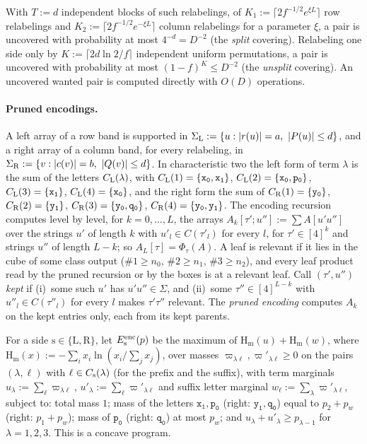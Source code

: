 \documentclass[11pt]{article}
\theoremstyle{definition}
\theoremstyle{remark}
\newcommand{\tl}[1]{\mathtt{#1}}
\newcommand{\Hm}{\mathrm{H}_{\mathrm m}}
\begin{document}
With $T:=d$ independent blocks of such relabelings, of $K_1:=\lceil2f^{-1/2}e^{\xi L}\rceil$ row relabelings and $K_2:=\lceil2f^{-1/2}e^{-\xi L}\rceil$ column relabelings for a parameter $\xi$, a pair is uncovered with probability at most $4^{-d}=D^{-2}$ (the \emph{split} covering). Relabeling one side only by $K:=\lceil2d\ln2/f\rceil$ independent uniform permutations, a pair is uncovered with probability at most $(1-f)^K\le D^{-2}$ (the \emph{unsplit} covering). An uncovered wanted pair is computed directly with $O(D)$ operations.

\paragraph{Pruned encodings.} A left array of a row band is supported in $\Sigma_{\rm L}:=\{u:|r(u)|=a,\ |P(u)|\le d\}$, and a right array of a column band, for every relabeling, in $\Sigma_{\rm R}:=\{v:|c(v)|=b,\ |Q(v)|\le d\}$. In characteristic two the left form of term $\lambda$ is the sum of the letters $C_{\rm L}(\lambda)$, with $C_{\rm L}(1)=\{\tl{x_0},\tl{x_1}\}$, $C_{\rm L}(2)=\{\tl{x_0},\tl{p_0}\}$, $C_{\rm L}(3)=\{\tl{x_1}\}$, $C_{\rm L}(4)=\{\tl{x_0}\}$, and the right form the sum of $C_{\rm R}(1)=\{\tl{y_0}\}$, $C_{\rm R}(2)=\{\tl{y_1}\}$, $C_{\rm R}(3)=\{\tl{y_0},\tl{q_0}\}$, $C_{\rm R}(4)=\{\tl{y_0},\tl{y_1}\}$. The encoding recursion~\cite[Lemma~2.3]{Maj26b} computes level by level, for $k=0,\dots,L$, the arrays $A_k[\tau';u'']:=\sum A[u'u'']$ over the strings $u'$ of length $k$ with $u'_l\in C(\tau'_l)$ for every $l$, for $\tau'\in[4]^k$ and strings $u''$ of length $L-k$; so $A_L[\tau]=\Phi_\tau(A)$. A leaf is relevant if it lies in the cube of some class output ($\#1\ge n_0$, $\#2\ge n_1$, $\#3\ge n_2$), and every leaf product read by the pruned recursion or by the boxes is at a relevant leaf. Call $(\tau',u'')$ \emph{kept} if (i)~some such $u'$ has $u'u''\in\Sigma$, and (ii)~some $\tau''\in[4]^{L-k}$ with $u''_l\in C(\tau''_l)$ for every $l$ makes $\tau'\tau''$ relevant. The \emph{pruned encoding} computes $A_k$ on the kept entries only, each from its kept parents.

For a side $\mathrm s\in\{\mathrm L,\mathrm R\}$, let $E^{\rm enc}_{\rm s}(p)$ be the maximum of $\Hm(u)+\Hm(w)$, where $\Hm(x):=-\sum_ix_i\ln(x_i/\sum_jx_j)$, over masses $\varpi_{\lambda\ell},\varpi'_{\lambda\ell}\ge0$ on the pairs $(\lambda,\ell)$ with $\ell\in C_{\rm s}(\lambda)$ (for the prefix and the suffix), with term marginals $u_\lambda:=\sum_\ell\varpi_{\lambda\ell}$, $u'_\lambda:=\sum_\ell\varpi'_{\lambda\ell}$ and suffix letter marginal $w_\ell:=\sum_\lambda\varpi'_{\lambda\ell}$, subject to: total mass $1$; mass of the letters $\tl{x_1},\tl{p_0}$ (right: $\tl{y_1},\tl{q_0}$) equal to $p_2+p_w$ (right: $p_1+p_w$); mass of $\tl{p_0}$ (right: $\tl{q_0}$) at most $p_w$; and $u_\lambda+u'_\lambda\ge p_{\lambda-1}$ for $\lambda=1,2,3$. This is a concave program.
\end{document}

